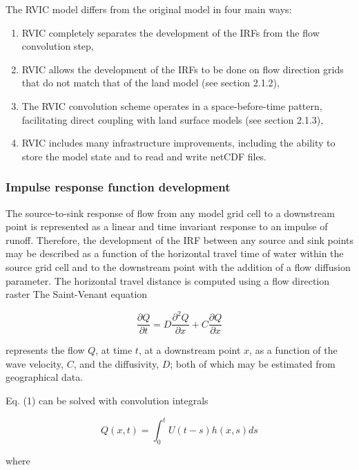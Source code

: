 \documentclass[jgrga, draft]{agutex}
\begin{document}
\begin{article}
The RVIC model differs from the original \citet{Lohmann_1996} model in four main ways:

\begin{enumerate}
\item RVIC completely separates the development of the IRFs from the flow convolution step,
\item RVIC allows the development of the IRFs to be done on flow direction grids that do not match that of the land model (see section 2.1.2),
\item The RVIC convolution scheme operates in a space-before-time pattern, facilitating direct coupling with land surface models (see section 2.1.3),
\item RVIC includes many infrastructure improvements, including the ability to store the model state and to read and write netCDF files.
\end{enumerate}

\subsubsection{Impulse response function development}

The source-to-sink response of flow from any model grid cell to a downstream point is represented as a linear and time invariant response to an impulse of runoff.
Therefore, the development of the IRF between any source and sink points may be described as a function of the horizontal travel time of water within the source grid cell and to the downstream point with the addition of a flow diffusion parameter.
The horizontal travel distance is computed using a flow direction raster \citep[e.g.][]{Wu_2011}
The Saint-Venant equation

 \begin{equation}
     \frac{\partial Q}{\partial t} = D \frac{\partial^2 Q}{\partial x} + C \frac{\partial Q}{\partial x}
 \end{equation}

represents the flow $Q$, at time $t$, at a downstream point $x$, as a function of the wave velocity, $C$, and the diffusivity, $D$; both of which may be estimated from geographical data.

Eq. (1) can be solved with convolution integrals

 \begin{equation}
	Q(x,t) = \int_0^t U(t-s)h(x,s)ds
 \end{equation}

where


\end{article}
\end{document}
